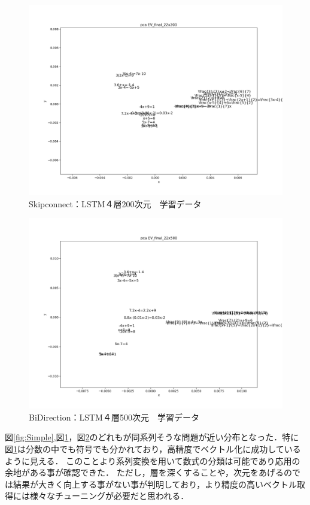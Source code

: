 \documentclass[a4paper,twocolumn]{jsarticle}
\begin{document}
\begin{center}
  \begin{figure}[htb]
    \centering
    \includegraphics[width=0.7\linewidth]{image/pca_formula_EV_final_22x200_1_Wed_Feb_06_04:42:56.png}
    \caption{Skipconnect：LSTM４層200次元　学習データ}
    \label{fig:Skip4layer}
  \end{figure}
\end{center}

\begin{center}
  \begin{figure}[htb]
    \centering
    \includegraphics[width=0.7\linewidth]{image/pca_formula_EV_final_22x500_1_Wed_Feb_06_04:57:54.png}
    \caption{BiDirection：LSTM４層500次元　学習データ}
    \label{fig:Bi500layer4}
  \end{figure}
\end{center}

図\ref{fig:Simple},図\ref{fig:Skip4layer}，図\ref{fig:Bi500layer4}のどれもが同系列そうな問題が近い分布となった．特に図\ref{fig:Skip4layer}は分数の中でも符号でも分かれており，高精度でベクトル化に成功しているように見える．
このことより系列変換を用いて数式の分類は可能であり応用の余地がある事が確認できた．
ただし，層を深くすることや，次元をあげるのでは結果が大きく向上する事がない事が判明しており，より精度の高いベクトル取得には様々なチューニングが必要だと思われる．
\end{document}
